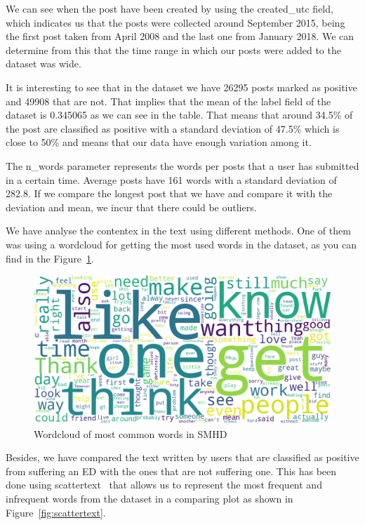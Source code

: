 We can see when the post have been created by using the created\_utc field, which indicates us that the posts were collected around September 2015, being the first post taken from April 2008 and the last one from January 2018. We can determine from this that the time range in which our posts were added to the dataset was wide.

It is interesting to see that in the dataset we have 26295 posts marked as positive and 49908 that are not. That implies that the mean of the label field of the dataset is 0.345065 as we can see in the table. That means that around 34.5\% of the post are classified as positive with a standard deviation of 47.5\% which is close to 50\% and means that our data have enough variation among it. 

The n\_words parameter represents the words per posts that a user has submitted in a certain time. Average posts have 161 words with a standard deviation of 282.8. If we compare the longest post that we have and compare it with the deviation and mean, we incur that there could be outliers.

 We have analyse the contentex in the text using different methods. One of them was using a wordcloud for getting the most used words in the dataset, as you can find in the Figure~\ref{fig:SMHDwordcloud}.

\begin{figure}[!htp]
    \centering
    \includegraphics[scale=0.3]{img/detection/SMHD_wordcloud.png}
    \caption{Wordcloud of most common words in SMHD}
    \label{fig:SMHDwordcloud}
\end{figure}

Besides, we have compared the text written by users that are classified as positive from suffering an ED with the ones that are not suffering one. This has been done using scattertext~\cite{JasonKes0:online} that allows us to represent the most frequent and infrequent words from the dataset in a comparing plot as shown in Figure~\ref{fig:scattertext}.

